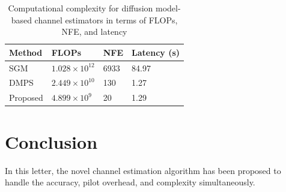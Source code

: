 \documentclass[lettersize,journal]{IEEEtran}
\begin{document}
\begin{table}[!t]
\centering
\renewcommand{\arraystretch}{1.1} 
\caption{Computational complexity for diffusion model-based channel estimators in terms of FLOPs, NFE, and latency}
\label{tab:table1}
\begin{tabular}{M{0.20\columnwidth}|M{0.21\columnwidth}|M{0.20\columnwidth}|M{0.20\columnwidth}}
\hline
\textbf{Method} & \textbf{FLOPs} & \textbf{NFE} & \textbf{Latency (s)} \\
\hline
SGM\cite{arvinteMIMOChannelEstimation2023} & \(1.028 \times 10^{12}\) & 6933 & 84.97 \\
\hline
DMPS\cite{zhouGenerativeDiffusionModels2025} & \(2.449 \times 10^{10}\) & 130 & 1.27 \\
\hline
Proposed & \(4.899 \times 10^9\) & 20 & 1.29 \\
\hline
\end{tabular}
\end{table}

\section{Conclusion}


In this letter, the novel channel estimation algorithm has been proposed to handle the accuracy, pilot overhead, and complexity simultaneously.



% 

\end{document}
